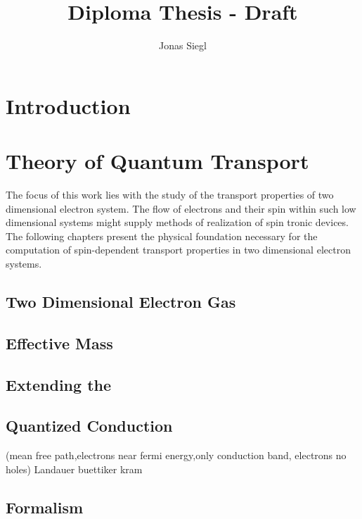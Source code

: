 
\author{Jonas Siegl}
\title{Diploma Thesis - Draft}




\maketitle
% 

\clearpage
\thispagestyle{empty}
\mbox{}
\clearpage
\thispagestyle{plain} %
\tableofcontents
\clearpage
\section{Introduction}
\clearpage
\section{Theory of Quantum Transport}
The focus of this work lies with the study of the transport properties of two dimensional electron system. The flow of electrons and their spin within such low dimensional systems might supply methods of realization of spin tronic devices.
 The following chapters present the physical foundation necessary for the computation of spin-dependent transport properties in two dimensional electron systems.
  \subsection{Two Dimensional Electron Gas}
    
  \subsection{Effective Mass \hamil{}}
    
  \subsection{Extending the \hamil{}}
    
  \subsection{Quantized Conduction}
(mean free path,electrons near fermi energy,only conduction band, electrons no holes)
  Landauer buettiker kram
  
  \subsection{\cgfnc{} Formalism}
  
